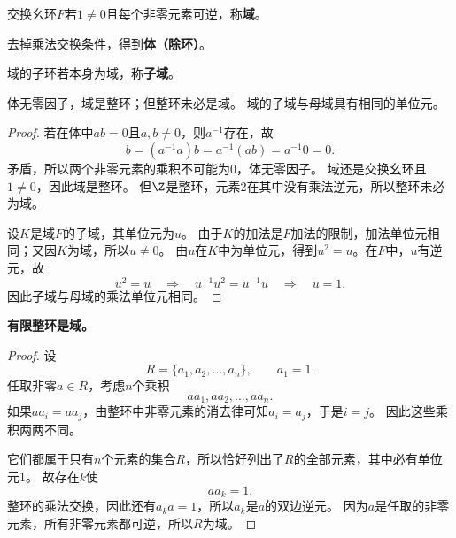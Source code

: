 \begin{definition}

\label{p2:concept:c1-l1035}交换幺环$F$若$1\neq0$且每个非零元素可逆，称\textbf{域}。

\label{p2:concept:c1-l1037}去掉乘法交换条件，得到\textbf{体（除环）}。

\label{p2:concept:c1-l1039}域的子环若本身为域，称\textbf{子域}。
\end{definition}

\begin{proposition}
体无零因子，域是整环；但整环未必是域。
域的子域与母域具有相同的单位元。
\end{proposition}
\begin{proof}
若在体中$ab=0$且$a,b\neq0$，则$a^{-1}$存在，故
\[b=(a^{-1}a)b=a^{-1}(ab)=a^{-1}0=0.\]
矛盾，所以两个非零元素的乘积不可能为0，体无零因子。
域还是交换幺环且$1\neq0$，因此域是整环。
但$\Z$是整环，元素2在其中没有乘法逆元，所以整环未必为域。

设$K$是域$F$的子域，其单位元为$u$。
由于$K$的加法是$F$加法的限制，加法单位元相同；又因$K$为域，所以$u\neq0$。
由$u$在$K$中为单位元，得到$u^2=u$。在$F$中，$u$有逆元，故
\[
u^2=u
\quad\Longrightarrow\quad
u^{-1}u^2=u^{-1}u
\quad\Longrightarrow\quad
u=1.
\]
因此子域与母域的乘法单位元相同。
\end{proof}

\begin{theorem}
\textbf{有限整环是域。}
\end{theorem}
\begin{proof}
设
\[
R=\{a_1,a_2,\ldots,a_n\},\qquad a_1=1.
\]
任取非零$a\in R$，考虑$n$个乘积
\[
aa_1,aa_2,\ldots,aa_n.
\]
如果$aa_i=aa_j$，由整环中非零元素的消去律可知$a_i=a_j$，于是$i=j$。
因此这些乘积两两不同。

它们都属于只有$n$个元素的集合$R$，所以恰好列出了$R$的全部元素，其中必有单位元1。
故存在$k$使
\[
aa_k=1.
\]
整环的乘法交换，因此还有$a_ka=1$，所以$a_k$是$a$的双边逆元。
因为$a$是任取的非零元素，所有非零元素都可逆，所以$R$为域。
\end{proof}

